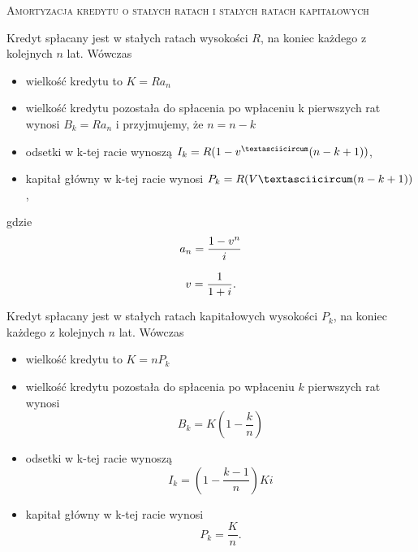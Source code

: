 \documentclass{article}
\begin{document}

\centerline{\Large{\textsc{Amortyzacja kredytu o stałych ratach i stałych ratach kapitałowych}}}
\setlength{\parskip}{4mm}





\bigskip





Kredyt spłacany jest w stałych ratach wysokości $R$, na koniec każdego z kolejnych $n$ lat. Wówczas
\begin{itemize}
\item wielkość kredytu to $K=Ra_n $
\item wielkość kredytu pozostała do spłacenia po wpłaceniu k pierwszych rat
wynosi $B_k=Ra_n$ i przyjmujemy, że $n=n-k$
\item odsetki w k-tej racie wynoszą $I_k=R(1-v^{\textasciicircum}(n-k+1))$,
\item kapitał główny w k-tej racie wynosi $P_k=R(V{\textasciicircum}(n-k+1))$,
\end{itemize}
gdzie
\begin{equation}
\footnotesize{a_n=\frac{1-v^n}{i}}  
\end{equation}

\begin{equation}
\footnotesize{v=\frac{1}{1+i}}.
\end{equation}


\bigskip
{}
\bigskip






Kredyt spłacany jest w stałych ratach kapitałowych wysokości $P_k$, na koniec każdego z kolejnych $n$ lat. Wówczas
\begin{itemize}
\item wielkość kredytu to $K=nP_k$
\item wielkość kredytu pozostała do spłacenia po wpłaceniu $k$ pierwszych rat
wynosi 
\begin{equation}
B_k=K(1-\frac{k}{n})
\end{equation}
\item odsetki w k-tej racie wynoszą 
\begin{equation}
I_k=(1-\frac{k-1}{n})Ki
\end{equation}
\item kapitał główny w k-tej racie wynosi
\begin{equation}
P_k=\frac{K}{n}.
\end{equation}
\end{itemize}
\end{document}

